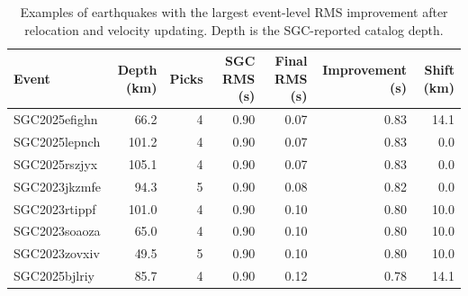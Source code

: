 \begin{table}[p]
\centering
\caption{Examples of earthquakes with the largest event-level RMS improvement after relocation and velocity updating. Depth is the SGC-reported catalog depth.}
\begin{tabular}{lrrrrrr}
\toprule
Event & Depth (km) & Picks & SGC RMS (s) & Final RMS (s) & Improvement (s) & Shift (km) \\
\midrule
SGC2025efighn & 66.2 & 4 & 0.90 & 0.07 & 0.83 & 14.1 \\
SGC2025lepnch & 101.2 & 4 & 0.90 & 0.07 & 0.83 & 0.0 \\
SGC2025rszjyx & 105.1 & 4 & 0.90 & 0.07 & 0.83 & 0.0 \\
SGC2023jkzmfe & 94.3 & 5 & 0.90 & 0.08 & 0.82 & 0.0 \\
SGC2023rtippf & 101.0 & 4 & 0.90 & 0.10 & 0.80 & 10.0 \\
SGC2023soaoza & 65.0 & 4 & 0.90 & 0.10 & 0.80 & 10.0 \\
SGC2023zovxiv & 49.5 & 5 & 0.90 & 0.10 & 0.80 & 10.0 \\
SGC2025bjlriy & 85.7 & 4 & 0.90 & 0.12 & 0.78 & 14.1 \\
\bottomrule
\end{tabular}
\end{table}
